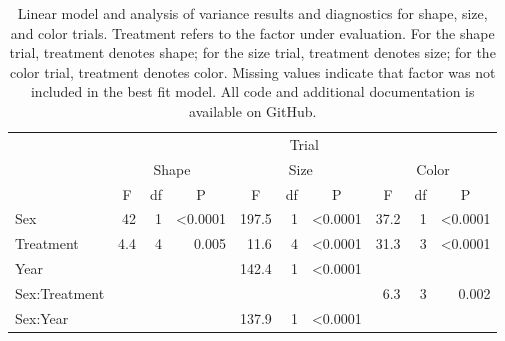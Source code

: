 \documentclass[alpha-refs]{wiley-article}
\begin{document}
\begin{table}[]
\caption{Linear model and analysis of variance results and diagnostics for shape, size, and color trials.  Treatment refers to the factor under evaluation. For the shape trial, treatment denotes shape; for the size trial, treatment denotes size; for the color trial, treatment denotes color.  Missing values indicate that factor was not included in the best fit model.  All code and additional documentation is available on GitHub.  }
\begin{tabular}{lrrrrrrrrr}
              & \multicolumn{9}{c}{Trial}                                                                                                                                                                                                \\ \cline{2-10} 
              & \multicolumn{3}{c}{Shape}                                              & \multicolumn{3}{c}{Size}                                               & \multicolumn{3}{c}{Color}                                              \\
              & \multicolumn{1}{c}{F} & \multicolumn{1}{c}{df} & \multicolumn{1}{c}{P} & \multicolumn{1}{c}{F} & \multicolumn{1}{c}{df} & \multicolumn{1}{c}{P} & \multicolumn{1}{c}{F} & \multicolumn{1}{c}{df} & \multicolumn{1}{c}{P} \\ \cline{2-10}
Sex           & 42                    & 1                      & \textless 0.0001      & 197.5                 & 1                      & \textless 0.0001      & 37.2                  & 1                      & \textless 0.0001      \\
Treatment     & 4.4                   & 4                      & 0.005                 & 11.6                  & 4                      & \textless 0.0001      & 31.3                  & 3                      & \textless 0.0001      \\
Year          &                       &                        &                       & 142.4                 & 1                      & \textless 0.0001      &                       &                        &                       \\
Sex:Treatment &                       &                        &                       &                       &                        &                       & 6.3                   & 3                      & 0.002                 \\
Sex:Year      &                       &                        &                       & 137.9                 & 1                      & \textless 0.0001      &                       &                        &                       \\ \cline{2-10} 

\end{tabular}
\end{table}
\end{document}
